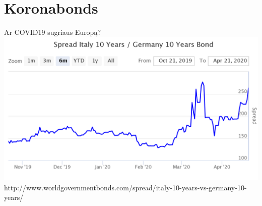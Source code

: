 \documentclass[11pt]{beamer}
\begin{document}
\section{Koronabonds}

\begin{frame}{Ar COVID19 sugriaus Europą?}
\includegraphics[scale=0.25]{spread-italy-10-years-ge.png}
http://www.worldgovernmentbonds.com/spread/italy-10-years-vs-germany-10-years/
\end{frame}
\end{document}
